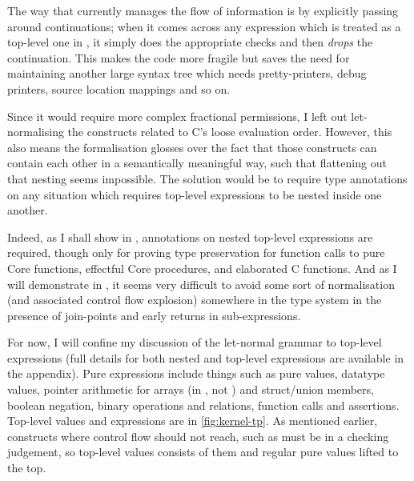 The way that  currently manages the flow of information is by explicitly
passing around continuations; when it comes across any expression which is
treated as a top-level one in , it simply does the appropriate
checks and then \emph{drops} the continuation.\label{sn:use-conts}
This makes the code more fragile but saves the need for maintaining another large
syntax tree which needs pretty-printers, debug printers, source location
mappings and so on.

Since it would require more complex fractional permissions, I left out
let-normalising the constructs related to C's loose evaluation order. However, this also means the formalisation glosses %
over the fact that those constructs can contain each other in a semantically
meaningful way, such that flattening out that nesting seems impossible. The
solution would be to require type annotations on any situation which requires
top-level expressions to be nested inside one another.

Indeed, as I shall show in , annotations on
nested top-level expressions are required, though only for proving type
preservation for function calls to pure Core functions, effectful Core
procedures, and elaborated C functions. And as I will demonstrate in
, it seems very difficult to avoid some sort
of normalisation (and associated control flow explosion) somewhere in the type
system in the presence of join-points and early returns in sub-expressions.

For now, I will confine my discussion of the let-normal grammar to top-level
expressions (full details for both nested and top-level expressions are
available in the appendix). Pure expressions include things such as pure values,
datatype values, pointer arithmetic for arrays (in , not )
and struct/union members, boolean negation, binary operations and relations, function
calls and assertions. Top-level values and expressions are in
\cref{fig:kernel-tp}. As mentioned earlier, constructs where control flow
should not reach, such as  must be in a checking %
judgement, so top-level values consists of them and regular pure values lifted
to the top.

